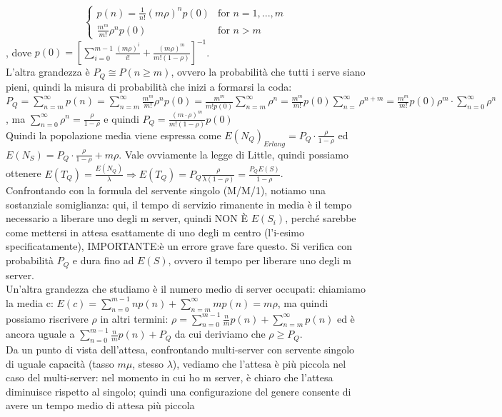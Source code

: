 \documentclass{article}
\begin{document}
\[
\begin{cases}
p(n) =
\frac{1}{n!}(m \rho)^n p(0) & \text{for } n = 1,...,m\\
\frac{m^m}{m!}\rho^np(0) & \text{for } n > m
\end{cases}
\], dove $p(0) = [\sum\limits_{i=0}^{m-1} \frac{(m \rho)^i}{i!} + \frac{(m\rho)^m}{m!(1 - \rho)}]^{-1}$. \\ L'altra grandezza è $P_Q \cong P(n \geq m)$, ovvero la probabilità che tutti i serve siano pieni, quindi la misura di probabilità che inizi a formarsi la coda: $P_Q = \sum\limits_{n=m}^{\infty} p(n) = \sum\limits_{n=m}^{\infty} \frac{m^m}{m!}\rho^n p(0) = \frac{m^m}{m!p(0)} \sum\limits_{n=m}^{\infty} \rho^n = \frac{m^m}{m!} p(0) \sum\limits_{n=}^{\infty} \rho^{n + m} = \frac{m^m}{m!} p(0) \rho^m \cdot \sum\limits_{n=0}^{\infty} \rho^n$, ma $\sum\limits_{n=0}^{\infty} \rho^n = \frac{\rho}{1 - \rho}$ e quindi $P_Q = \frac{(m\cdot \rho)^m}{m!(1 - \rho)}p(0)$\\ Quindi la popolazione media viene espressa come $E(N_Q)_{Erlang} = P_Q \cdot \frac{\rho}{1 - \rho}$ ed $E(N_S) = P_Q\cdot \frac{\rho}{1 - \rho} + m \rho$. Vale ovviamente la legge di Little, quindi possiamo ottenere $E(T_Q) = \frac{E(N_Q)}{\lambda} \Rightarrow E(T_Q) = P_Q \frac{\rho}{\lambda(1 - \rho)} = \frac{P_QE(S)}{1 - \rho}$.\\ Confrontando con la formula del servente singolo (M/M/1), notiamo una sostanziale somiglianza: qui, il tempo di servizio rimanente in media è il tempo necessario a liberare uno degli m server, quindi NON È $E(S_i)$, perché sarebbe come mettersi in attesa esattamente di uno degli m centro (l'i-esimo specificatamente), IMPORTANTE:è un errore grave fare questo. Si verifica con probabilità $P_Q$ e dura fino ad $E(S)$, ovvero il tempo per liberare uno degli m server.\\ Un'altra grandezza che studiamo è il numero medio di server occupati: chiamiamo la media c: $E(c) = \sum\limits_{n=0}^{m-1} np(n) + \sum\limits_{n=m}^{\infty} mp(n) = m \rho$, ma quindi possiamo riscrivere $\rho$ in altri termini: $\rho = \sum\limits_{n=0}^{m-1} \frac{n}{m}p(n) + \sum\limits_{n=m}^{\infty} p(n)$ ed è ancora uguale a $\sum\limits_{n=0}^{m-1} \frac{n}{m}p(n) + P_Q$ da cui deriviamo che $\rho \geq P_Q$.\\ Da un punto di vista dell'attesa, confrontando multi-server con servente singolo di uguale capacità (tasso $m \mu$, stesso $\lambda$), vediamo che l'attesa è più piccola nel caso del multi-server: nel momento in cui ho m server, è chiaro che l'attesa diminuisce rispetto al singolo; quindi una configurazione del genere consente di avere un tempo medio di attesa più piccola
\end{document}
